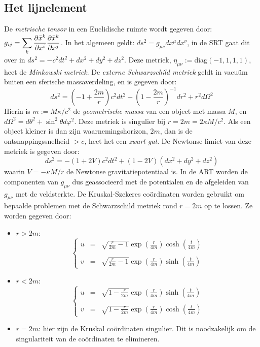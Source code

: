 \documentclass[twoside]{report}
\begin{document}
\subsection{Het lijnelement}
De {\it metrische tensor} in een Euclidische ruimte wordt gegeven door:
$\displaystyle g_{ij}=\sum_k\frac{\partial \bar{x}^k}{\partial x^i}\frac{\partial \bar{x}^k}{\partial x^j}$.
\npar
In het algemeen geldt: $ds^2=g_{\mu\nu}dx^\mu dx^\nu$, in de SRT gaat dit
over in $ds^2=-c^2dt^2+dx^2+dy^2+dz^2$. Deze metriek,
$\eta_{\mu\nu}:=$diag$(-1,1,1,1)$, heet de {\it Minkowski metriek}.
\npar
De {\it externe Schwarzschild metriek} geldt in vacu\"um buiten een sferische
massaverdeling, en is gegeven door:
\[
ds^2=\left(-1+\frac{2m}{r}\right)c^2dt^2+\left(1-\frac{2m}{r}\right)^{-1}dr^2+r^2d\Omega^2
\]
Hierin is $m:=M\kappa/c^2$ de {\it geometrische massa} van een object met
massa $M$, en $d\Omega^2=d\theta^2+\sin^2\theta d\varphi^2$. Deze metriek is
singulier bij $r=2m=2\kappa M/c^2$. Als een object kleiner is dan zijn
waarnemingshorizon, $2m$, dan is de ontsnappingssnelheid $>c$, heet het een
{\it zwart gat}. De Newtonse limiet van deze metriek is gegeven door:
\[
ds^2=-(1+2V)c^2dt^2+(1-2V)(dx^2+dy^2+dz^2)
\]
waarin $V=-\kappa M/r$ de Newtonse gravitatiepotentiaal is. In de ART worden
de componenten van $g_{\mu\nu}$ dus geassocieerd met de potentialen en de
afgeleiden van $g_{\mu\nu}$ met de veldsterkte.
\npar
De Kruskal-Szekeres co\"ordinaten worden gebruikt om bepaalde problemen met
de Schwarzschild metriek rond $r=2m$ op te lossen. Ze worden gegeven door:
\begin{itemize}
\item $r>2m$:
\[
\left\{\begin{array}{ccl}
u&=&\displaystyle{\sqrt{\frac{r}{2m}-1}\exp\left(\frac{r}{4m}\right)\cosh\left(\frac{t}{4m}\right)}\\
&&\\
v&=&\displaystyle{\sqrt{\frac{r}{2m}-1}\exp\left(\frac{r}{4m}\right)\sinh\left(\frac{t}{4m}\right)}
\end{array}\right.
\]
\item $r<2m$:
\[
\left\{\begin{array}{ccl}
u&=&\displaystyle{\sqrt{1-\frac{r}{2m}}\exp\left(\frac{r}{4m}\right)\sinh\left(\frac{t}{4m}\right)}\\
&&\\
v&=&\displaystyle{\sqrt{1-\frac{r}{2m}}\exp\left(\frac{r}{4m}\right)\cosh\left(\frac{t}{4m}\right)}
\end{array}\right.
\]
\item $r=2m$: hier zijn de Kruskal co\"ordinaten singulier. Dit is
noodzakelijk om de singulariteit van de co\"ordinaten te elimineren.
\end{itemize}
\end{document}
